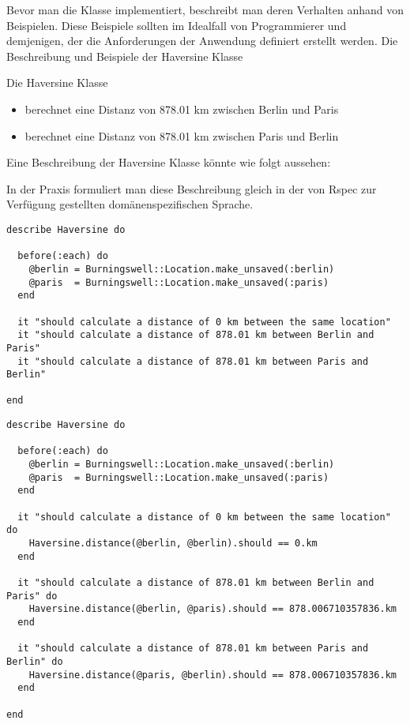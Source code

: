 Bevor man die Klasse implementiert, beschreibt man deren Verhalten
anhand von Beispielen. Diese Beispiele sollten im Idealfall von
Programmierer und demjenigen, der die Anforderungen der Anwendung
definiert erstellt werden. Die Beschreibung und Beispiele der
Haversine Klasse

Die Haversine Klasse
\begin{itemize}
\item berechnet eine Distanz von 878.01 km zwischen Berlin und Paris
\item berechnet eine Distanz von 878.01 km zwischen Paris und Berlin
\end{itemize}

Eine Beschreibung der
Haversine Klasse könnte wie folgt aussehen:

In der Praxis formuliert man diese Beschreibung gleich in der von
Rspec zur Verfügung gestellten domänen\-spezifischen Sprache.

{\small
\begin{verbatim}
describe Haversine do

  before(:each) do
    @berlin = Burningswell::Location.make_unsaved(:berlin)
    @paris  = Burningswell::Location.make_unsaved(:paris)
  end

  it "should calculate a distance of 0 km between the same location"
  it "should calculate a distance of 878.01 km between Berlin and Paris"
  it "should calculate a distance of 878.01 km between Paris and Berlin"

end
\end{verbatim}
}

{\small
\begin{verbatim}
describe Haversine do

  before(:each) do
    @berlin = Burningswell::Location.make_unsaved(:berlin)
    @paris  = Burningswell::Location.make_unsaved(:paris)
  end

  it "should calculate a distance of 0 km between the same location" do
    Haversine.distance(@berlin, @berlin).should == 0.km
  end

  it "should calculate a distance of 878.01 km between Berlin and Paris" do
    Haversine.distance(@berlin, @paris).should == 878.006710357836.km
  end

  it "should calculate a distance of 878.01 km between Paris and Berlin" do
    Haversine.distance(@paris, @berlin).should == 878.006710357836.km
  end

end
\end{verbatim}
}

